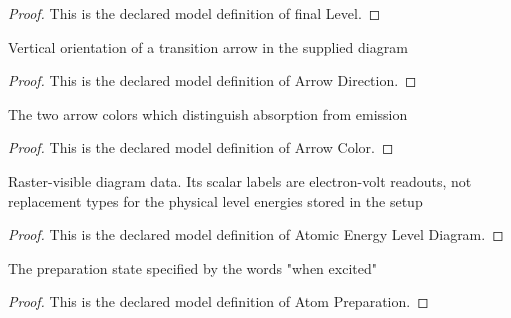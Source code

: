 \begin{proof}
  This is the declared model definition of final Level.
\end{proof}
\begin{definition}
  \label{def:physics:phyx-mini-0517:phyxminiproblems-problemphyxmini0517-arrowdirection}
  Vertical orientation of a transition arrow in the supplied diagram
\end{definition}
\begin{proof}
  This is the declared model definition of Arrow Direction.
\end{proof}
\begin{definition}
  \label{def:physics:phyx-mini-0517:phyxminiproblems-problemphyxmini0517-arrowcolor}
  The two arrow colors which distinguish absorption from emission
\end{definition}
\begin{proof}
  This is the declared model definition of Arrow Color.
\end{proof}
\begin{definition}
  \label{def:physics:phyx-mini-0517:phyxminiproblems-problemphyxmini0517-atomicenergyleveldiagram}
  Raster-visible diagram data. Its scalar labels are electron-volt readouts, not replacement types for the physical level energies stored in the setup
\end{definition}
\begin{proof}
  This is the declared model definition of Atomic Energy Level Diagram.
\end{proof}
\begin{definition}
  \label{def:physics:phyx-mini-0517:phyxminiproblems-problemphyxmini0517-atompreparation}
  The preparation state specified by the words "when excited"
\end{definition}
\begin{proof}
  This is the declared model definition of Atom Preparation.
\end{proof}
